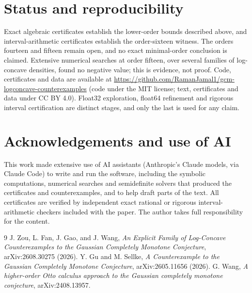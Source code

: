 \documentclass[11pt]{article}
\begin{document}
\section{Status and reproducibility}
Exact algebraic certificates establish the lower-order bounds described above,
and interval-arithmetic certificates establish the order-sixteen witness. The
orders fourteen and fifteen remain open, and no exact minimal-order conclusion is
claimed. Extensive numerical searches at order fifteen, over several families of
log-concave densities, found no negative value; this is evidence, not proof.
Code, certificates and data are available at
\url{https://github.com/RamanJamal1/gcm-logconcave-counterexamples}
(code under the MIT license; text, certificates and data under CC BY 4.0).
Float32 exploration, float64 refinement and rigorous interval certification
are distinct stages, and only the last is used for any claim.

\section*{Acknowledgements and use of AI}
This work made extensive use of AI assistants (Anthropic's Claude models, via
Claude Code) to write and run the software, including the symbolic
computations, numerical searches and semidefinite solvers that produced the
certificates and counterexamples, and to help draft parts of the text. All
certificates are verified by independent exact rational or rigorous
interval-arithmetic checkers included with the paper. The author takes full
responsibility for the content.

\begin{thebibliography}{9}
 J. Zou, L. Fan, J. Gao, and J. Wang,
\emph{An Explicit Family of Log-Concave Counterexamples to the Gaussian
Completely Monotone Conjecture}, arXiv:2608.30275 (2026).
 Y. Gu and M. Sellke,
\emph{A Counterexample to the Gaussian Completely Monotone Conjecture},
arXiv:2605.11656 (2026).
 G. Wang,
\emph{A higher-order Otto calculus approach to the Gaussian completely
monotone conjecture}, arXiv:2408.13957.
\end{thebibliography}
\end{document}

